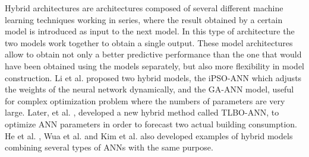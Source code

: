Hybrid architectures are architectures composed of several different machine learning techniques working in series, where the result obtained by a certain model is introduced as input to the next model. In this type of architecture the two models work together to obtain a single output. These model architectures allow to obtain not only a better predictive performance than the one that would have been obtained using the models separately, but also more flexibility in model construction. Li et al. \cite{annr12} proposed two hybrid models, the \ac{iPSO-ANN} which adjusts the weights of the neural network dynamically, and the \ac{GA-ANN} model, useful for complex optimization problem where the numbers of parameters are very large. Later, et al. \cite{annr24}, developed a new hybrid method called \ac{TLBO-ANN}, to optimize \ac{ANN} parameters in order to forecast two actual building consumption. He et al. \cite{annr27}, Wua et al. \cite{annr28} and Kim et al. \cite{annr29} also developed examples of hybrid models combining several types of \ac{ANN}s with the same purpose. 




